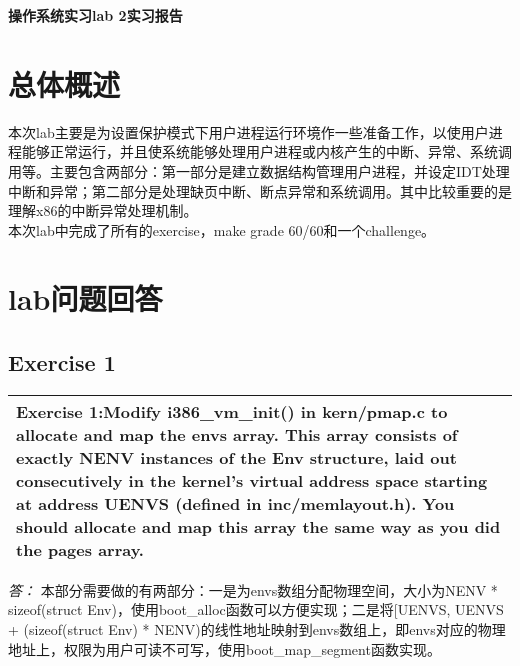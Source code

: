 \documentclass[11pt,a4paper]{article}
\newcommand{\exercise}[2]{
\begin{tabular}{|p{\textwidth}|}
\hline
Exercise #1:#2\\
\hline
\end{tabular}
\textit{\large{答：}}}
\begin{document}

\centerline{\Huge{\textbf{操作系统实习lab 2实习报告}}}
\tableofcontents
\thispagestyle{empty}

\section{总体概述}
本次lab主要是为设置保护模式下用户进程运行环境作一些准备工作，以使用户进程能够正常运行，并且使系统能够处理用户进程或内核产生的中断、异常、系统调用等。主要包含两部分：第一部分是建立数据结构管理用户进程，并设定IDT处理中断和异常；第二部分是处理缺页中断、断点异常和系统调用。其中比较重要的是理解x86的中断异常处理机制。\\
本次lab中完成了所有的exercise，make grade 60/60和一个challenge。\\

\section{lab问题回答}
\subsection{Exercise 1}
\exercise{1}{Modify i386\_vm\_init() in kern/pmap.c  to allocate and map the envs array. This array consists of exactly NENV instances of the Env structure, laid out consecutively in the kernel's virtual address space starting at address UENVS  (defined in inc/memlayout.h). You should allocate and map this array the same way as you did the pages array.}
本部分需要做的有两部分：一是为envs数组分配物理空间，大小为NENV * sizeof(struct Env)，使用boot\_alloc函数可以方便实现；二是将[UENVS, UENVS + (sizeof(struct Env) * NENV)的线性地址映射到envs数组上，即envs对应的物理地址上，权限为用户可读不可写，使用boot\_map\_segment函数实现。\\
\end{document}
